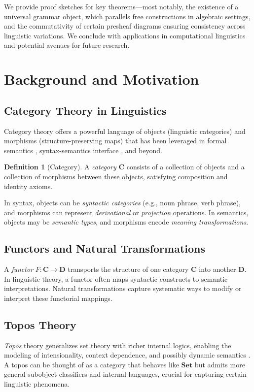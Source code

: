 \documentclass[12pt]{article}
\theoremstyle{plain}
\theoremstyle{definition}
\newtheorem{definition}[theorem]{Definition}
\begin{document}
We provide proof sketches for key theorems—most notably, the existence of a universal grammar object, which parallels free constructions in algebraic settings, and the commutativity of certain presheaf diagrams ensuring consistency across linguistic variations. We conclude with applications in computational linguistics and potential avenues for future research.

\section{Background and Motivation}
\subsection{Category Theory in Linguistics}
Category theory offers a powerful language of objects (linguistic categories) and morphisms (structure-preserving maps) that has been leveraged in formal semantics \cite{Montague}, syntax-semantics interface \cite{BarkerShan}, and beyond.  

\begin{definition}[Category]
A \emph{category} \(\mathbf{C}\) consists of a collection of objects and a collection of morphisms between these objects, satisfying composition and identity axioms. 
\end{definition}

In syntax, objects can be \emph{syntactic categories} (e.g., noun phrase, verb phrase), and morphisms can represent \emph{derivational} or \emph{projection} operations. In semantics, objects may be \emph{semantic types}, and morphisms encode \emph{meaning transformations}.

\subsection{Functors and Natural Transformations}
A \emph{functor} \(F: \mathbf{C} \to \mathbf{D}\) transports the structure of one category \(\mathbf{C}\) into another \(\mathbf{D}\). In linguistic theory, a functor often maps syntactic constructs to semantic interpretations. Natural transformations capture systematic ways to modify or interpret these functorial mappings.

\subsection{Topos Theory}
\emph{Topos} theory generalizes set theory with richer internal logics, enabling the modeling of intensionality, context dependence, and possibly dynamic semantics \cite{LambekScott}. A topos can be thought of as a category that behaves like \(\mathbf{Set}\) but admits more general subobject classifiers and internal languages, crucial for capturing certain linguistic phenomena.
\end{document}
